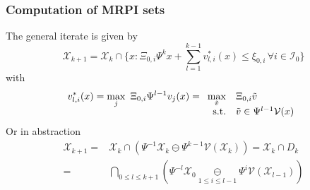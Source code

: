 \documentclass{beamer}
\theoremstyle{plain}
\begin{document}
\begin{frame}
\frametitle{Computation of MRPI sets}
The general iterate is given by
\begin{equation*}
	\mathcal X_{k+1} = \mathcal X_k\cap\{x: \Xi_{0,i}\Psi^k x + \sum_{l=1}^{k-1}v_{l,i}^\ast(x)
	\leq\xi_{0,i}\,\forall i\in\mathcal I_0\}
\end{equation*}
with
\begin{equation*}
	v_{l,i}^\ast(x)=\max_j \ \Xi_{0,i}\Psi^{l-1}v_j(x)
   = \begin{array}[t]{rl} \displaystyle\max_{\tilde v} & \Xi_{0,i}\tilde v\\ \text{s.t.}& \tilde v\in 
   \Psi^{l-1}\mathcal V(x)\end{array}
\end{equation*}
Or in abstraction
\begin{equation*}
	\begin{split}
		\mathcal X_{k+1} =& \mathcal X_k\cap\left(\Psi^{-1}\mathcal X_k \ominus \Psi^{k-1}\mathcal V(\mathcal X_k)\right)
	=\mathcal X_k\cap D_k \\
	=& \bigcap_{0\leq l\leq k+1}\left( \Psi^{-l} \mathcal X_0 \underset{1 \leq i\leq l-1}{\ominus} 
  \Psi^i \mathcal V(\mathcal X_{l-1})\right)
	\end{split}
\end{equation*}

\end{frame}
\end{document}
